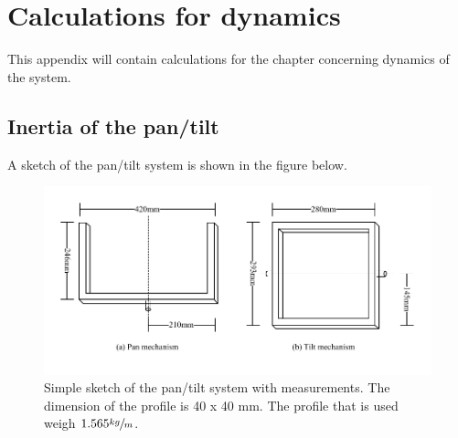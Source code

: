 \chapter{Calculations for dynamics}\label{app:dynamics_calc}
This appendix will contain calculations for the chapter concerning dynamics of the system.

\section{Inertia of the pan/tilt}
A sketch of the pan/tilt system is shown in the figure below.
\begin{figure}[htb]
	\centering
	\includegraphics[width=\textwidth]{graphics/pan_tilt_sketch.pdf} %
	\caption{Simple sketch of the pan/tilt system with measurements. The dimension of the profile is 40 x 40 mm. The profile that is used weigh $1.565\sfrac{kg}{m}$.}
	\label{fig:pan_tilt_sketch}			%
\end{figure}

